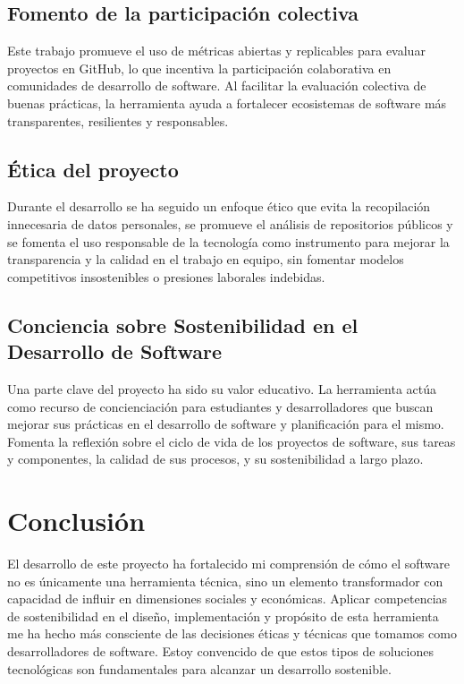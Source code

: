 \subsection{Fomento de la participación colectiva}
Este trabajo promueve el uso de métricas abiertas y replicables para evaluar proyectos en GitHub, lo que incentiva la participación colaborativa en comunidades de desarrollo de software. Al facilitar la evaluación colectiva de buenas prácticas, la herramienta ayuda a fortalecer ecosistemas de software más transparentes, resilientes y responsables.

\subsection{Ética del proyecto}
Durante el desarrollo se ha seguido un enfoque ético que evita la recopilación innecesaria de datos personales, se promueve el análisis de repositorios públicos y se fomenta el uso responsable de la tecnología como instrumento para mejorar la transparencia y la calidad en el trabajo en equipo, sin fomentar modelos competitivos insostenibles o presiones laborales indebidas.

\subsection{Conciencia sobre Sostenibilidad en el Desarrollo de Software}
Una parte clave del proyecto ha sido su valor educativo. La herramienta actúa como recurso de concienciación para estudiantes y desarrolladores que buscan mejorar sus prácticas en el desarrollo de software y planificación para el mismo. Fomenta la reflexión sobre el ciclo de vida de los proyectos de software, sus tareas y componentes, la calidad de sus procesos, y su sostenibilidad a largo plazo.

\section{Conclusión}
El desarrollo de este proyecto ha fortalecido mi comprensión de cómo el software no es únicamente una herramienta técnica, sino un elemento transformador con capacidad de influir en dimensiones sociales y económicas. Aplicar competencias de sostenibilidad en el diseño, implementación y propósito de esta herramienta me ha hecho más consciente de las decisiones éticas y técnicas que tomamos como desarrolladores de software. Estoy convencido de que estos tipos de soluciones tecnológicas son fundamentales para alcanzar un desarrollo sostenible.